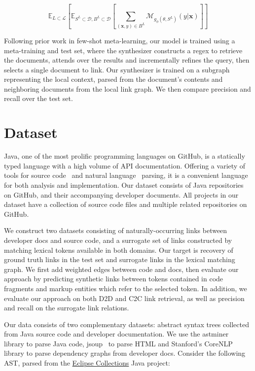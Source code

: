 \documentclass{article}
\begin{document}
\begin{equation}
    \mathbb{E}_{L\subset\mathcal{L}}[ \mathbb{E}_{S^L \subset\mathcal{D}, B^L \subset\mathcal{D}} [\sum_{(\mathbf{x}, y)\in B^L} \mathcal M_{g_\phi(\theta, S^L)}(y \vert \mathbf{x})]]
\end{equation}

Following prior work in few-shot meta-learning, our model is trained using a meta-training and test set, where the synthesizer constructs a regex to retrieve the documents, attends over the results and incrementally refines the query, then selects a single document to link. Our synthesizer is trained on a subgraph representing the local context, parsed from the document's contents and neighboring documents from the local link graph. We then compare precision and recall over the test set.

\section{Dataset}

Java, one of the most prolific programming languages on GitHub, is a statically typed language with a high volume of API documentation. Offering a variety of tools for source code~\citep{parr2013definitive, hosseini2013javaparser, kovalenko2019pathminer} and natural language~\citep{manning2014stanford, grella2018non} parsing, it is a convenient language for both analysis and implementation. Our dataset consists of Java repositories on GitHub, and their accompanying developer documents. All projects in our dataset have a collection of source code files and multiple related repositories on GitHub.

We construct two datasets consisting of naturally-occurring links between developer docs and source code, and a surrogate set of links constructed by matching lexical tokens available in both domains. Our target is recovery of ground truth links in the test set and surrogate links in the lexical matching graph. We first add weighted edges between code and docs, then evaluate our approach by predicting synthetic links between tokens contained in code fragments and markup entities which refer to the selected token. In addition, we evaluate our approach on both D2D and C2C link retrieval, as well as precision and recall on the surrogate link relations.

Our data consists of two complementary datasets: abstract syntax trees collected from Java source code and developer documentation. We use the astminer~\citep{kovalenko2019pathminer} library to parse Java code, jsoup~\citep{hedley2009jsoup} to parse HTML and Stanford's CoreNLP~\citep{manning2014stanford} library to parse dependency graphs from developer docs. Consider the following AST, parsed from the \href{https://www.eclipse.org/collections/}{Eclipse Collections} Java project:
\end{document}

